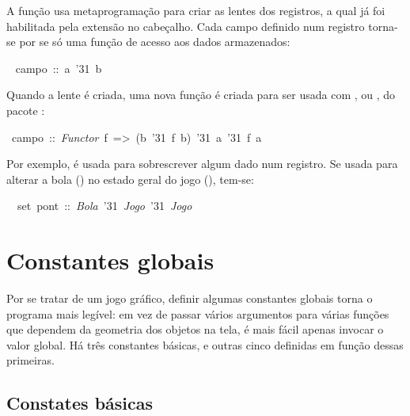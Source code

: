 \documentclass[12pt,a4paper,oneside]{article}
\newcommand{\texfamily}{\fontfamily{cmtex}\selectfont}
\begin{document}
A fun\c c\~ao  usa metaprograma\c c\~ao para criar as lentes dos registros, a qual j\'a foi habilitada pela extens\~ao  no cabe\c calho.
Cada campo definido num registro torna-se por se s\'o uma fun\c c\~ao de acesso aos dados armazenados:

\begin{tabbing}\texfamily
~ campo~::~a~\char'31~b~
\end{tabbing}

Quando a lente \'e criada, uma nova fun\c c\~ao \'e criada para ser usada com ,  ou , do pacote :

\begin{tabbing}\texfamily
~campo~::~{\itshape Functor}~f~=>~(b~\char'31~f~b)~\char'31~a~\char'31~f~a~
\end{tabbing}

Por exemplo,  \'e usada para sobrescrever algum dado num registro.
Se usada para alterar a bola () no estado geral do jogo (), tem-se:

\begin{tabbing}\texfamily
~~set~pont~::~{\itshape Bola}~\char'31~{\itshape Jogo}~\char'31~{\itshape Jogo}
\end{tabbing}


\section{Constantes globais}

Por se tratar de um jogo gr\'afico, definir algumas constantes globais torna o programa mais leg\'ivel:
em vez de passar v\'arios argumentos para v\'arias fun\c c\~oes que dependem da geometria dos objetos na tela, \'e mais f\'acil apenas invocar o valor global.
H\'a tr\^es constantes b\'asicas, e outras cinco definidas em fun\c c\~ao dessas primeiras.


\subsection{Constates b\'asicas}
\end{document}
